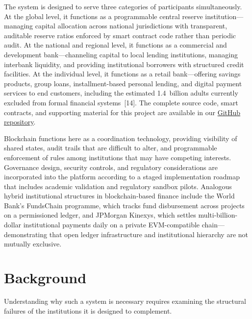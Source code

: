 \documentclass[12pt,a4paper]{report}
\begin{document}
The system is designed to serve three categories of participants simultaneously. At the global level, it functions as a programmable central reserve institution---managing capital allocation across national jurisdictions with transparent, auditable reserve ratios enforced by smart contract code rather than periodic audit. At the national and regional level, it functions as a commercial and development bank---channeling capital to local lending institutions, managing interbank liquidity, and providing institutional borrowers with structured credit facilities. At the individual level, it functions as a retail bank---offering savings products, group loans, installment-based personal lending, and digital payment services to end customers, including the estimated 1.4~billion adults currently excluded from formal financial systems~[14]. The complete source code, smart contracts, and supporting material for this project are available in our \href{https://github.com/Yuvraajrahman/Cryto-World-Bank}{GitHub repository}.

Blockchain functions here as a coordination technology, providing visibility of shared states, audit trails that are difficult to alter, and programmable enforcement of rules among institutions that may have competing interests. Governance design, security controls, and regulatory considerations are incorporated into the platform according to a staged implementation roadmap that includes academic validation and regulatory sandbox pilots. Analogous hybrid institutional structures in blockchain-based finance include the World Bank's FundsChain programme, which tracks fund disbursement across projects on a permissioned ledger, and JPMorgan Kinexys, which settles multi-billion-dollar institutional payments daily on a private EVM-compatible chain---demonstrating that open ledger infrastructure and institutional hierarchy are not mutually exclusive.

\section{Background}

Understanding why such a system is necessary requires examining the structural failures of the institutions it is designed to complement.
\end{document}
